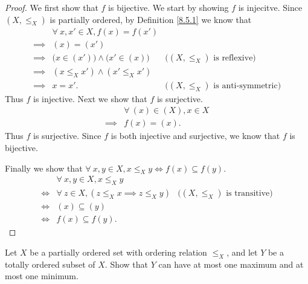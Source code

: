 \begin{proof}
    We first show that \(f\) is bijective.
    We start by showing \(f\) is injecitve.
    Since \((X, \leq_X)\) is partially ordered, by Definition \ref{8.5.1} we know that
    \begin{align*}
                 & \forall\ x, x' \in X, f(x) = f(x')                                                           \\
        \implies & (x) = (x')                                                                                   \\
        \implies & \big(x \in (x')\big) \land \big(x' \in (x)\big) & \text{(\((X, \leq_X)\) is reflexive)}      \\
        \implies & (x \leq_X x') \land (x' \leq_X x')                                                           \\
        \implies & x = x'.                                         & \text{(\((X, \leq_X)\) is anti-symmetric)}
    \end{align*}
    Thus \(f\) is injective.
    Next we show that \(f\) is surjective.
    \begin{align*}
                 & \forall\ (x) \in (X), x \in X \\
        \implies & f(x) = (x).
    \end{align*}
    Thus \(f\) is surjective.
    Since \(f\) is both injective and surjective, we know that \(f\) is bijective.

    Finally we show that \(\forall\ x, y \in X, x \leq_X y \iff f(x) \subseteq f(y)\).
    \begin{align*}
             & \forall\ x, y \in X, x \leq_X y                                                             \\
        \iff & \forall\ z \in X, (z \leq_X x \implies z \leq_X y) & \text{(\((X, \leq_X)\) is transitive)} \\
        \iff & (x) \subseteq (y)                                                                           \\
        \iff & f(x) \subseteq f(y).
    \end{align*}
\end{proof}

\begin{exercise}\label{ex 8.5.7}
    Let \(X\) be a partially ordered set with ordering relation \(\leq_X\), and let \(Y\) be a totally ordered subset of \(X\).
    Show that \(Y\) can have at most one maximum and at most one minimum.
\end{exercise}


